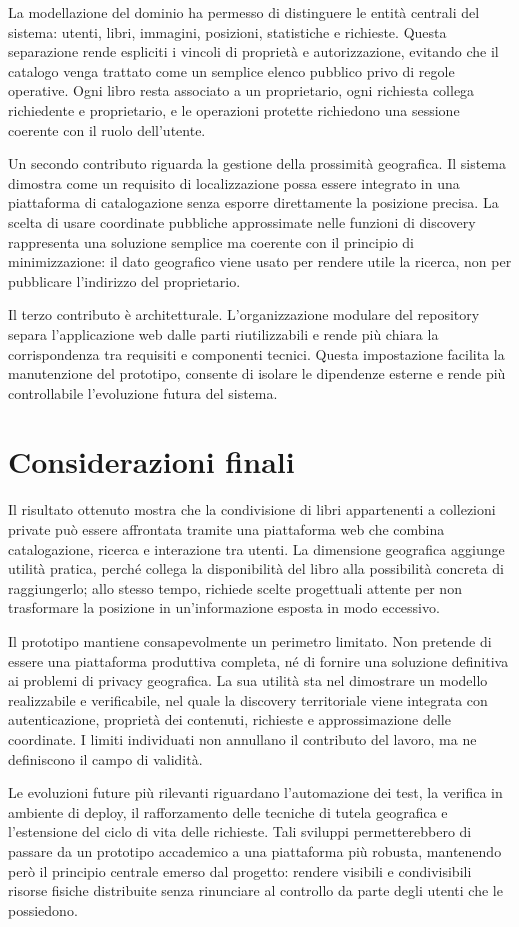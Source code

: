 La modellazione del dominio ha permesso di distinguere le entità centrali del sistema: utenti, libri, immagini, posizioni, statistiche e richieste. Questa separazione rende espliciti i vincoli di proprietà e autorizzazione, evitando che il catalogo venga trattato come un semplice elenco pubblico privo di regole operative. Ogni libro resta associato a un proprietario, ogni richiesta collega richiedente e proprietario, e le operazioni protette richiedono una sessione coerente con il ruolo dell'utente.

Un secondo contributo riguarda la gestione della prossimità geografica. Il sistema dimostra come un requisito di localizzazione possa essere integrato in una piattaforma di catalogazione senza esporre direttamente la posizione precisa. La scelta di usare coordinate pubbliche approssimate nelle funzioni di discovery rappresenta una soluzione semplice ma coerente con il principio di minimizzazione: il dato geografico viene usato per rendere utile la ricerca, non per pubblicare l'indirizzo del proprietario.

Il terzo contributo è architetturale. L'organizzazione modulare del repository separa l'applicazione web dalle parti riutilizzabili e rende più chiara la corrispondenza tra requisiti e componenti tecnici. Questa impostazione facilita la manutenzione del prototipo, consente di isolare le dipendenze esterne e rende più controllabile l'evoluzione futura del sistema.

\section{Considerazioni finali}
\label{sec:considerazioni-finali}

Il risultato ottenuto mostra che la condivisione di libri appartenenti a collezioni private può essere affrontata tramite una piattaforma web che combina catalogazione, ricerca e interazione tra utenti. La dimensione geografica aggiunge utilità pratica, perché collega la disponibilità del libro alla possibilità concreta di raggiungerlo; allo stesso tempo, richiede scelte progettuali attente per non trasformare la posizione in un'informazione esposta in modo eccessivo.

Il prototipo mantiene consapevolmente un perimetro limitato. Non pretende di essere una piattaforma produttiva completa, né di fornire una soluzione definitiva ai problemi di privacy geografica. La sua utilità sta nel dimostrare un modello realizzabile e verificabile, nel quale la discovery territoriale viene integrata con autenticazione, proprietà dei contenuti, richieste e approssimazione delle coordinate. I limiti individuati non annullano il contributo del lavoro, ma ne definiscono il campo di validità.

Le evoluzioni future più rilevanti riguardano l'automazione dei test, la verifica in ambiente di deploy, il rafforzamento delle tecniche di tutela geografica e l'estensione del ciclo di vita delle richieste. Tali sviluppi permetterebbero di passare da un prototipo accademico a una piattaforma più robusta, mantenendo però il principio centrale emerso dal progetto: rendere visibili e condivisibili risorse fisiche distribuite senza rinunciare al controllo da parte degli utenti che le possiedono.
